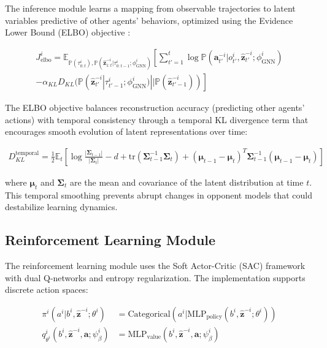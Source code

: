 The inference module learns a mapping from observable trajectories to latent variables predictive of other agents' behaviors, optimized using the Evidence Lower Bound (ELBO) objective \citep{kim2022influencing}:

\begin{align}
    J^i_{\text{elbo}} = \mathbb{E}_{\mathbb{P}(\tau^i_{0:t}),\mathbb{P}(\boldsymbol{\hat{z}}^{-i}_{1:t}|\tau^i_{0:t-1};\phi^i_{\text{GNN}})}\left[ \sum_{t'=1}^t \log \mathbb{P}(\boldsymbol{a}^{-i}_{t'}|o^i_{t'}, \boldsymbol{\hat{z}}^{-i}_{t'}; \phi^i_{\text{GNN}}) \right. \\
    \left. - \alpha_{KL} D_{KL}(\mathbb{P}(\boldsymbol{\hat{z}}^{-i}_{t'}|\tau^i_{t'-1}; \phi^i_{\text{GNN}})||\mathbb{P}(\boldsymbol{\hat{z}}^{-i}_{t'-1}))\right]
\end{align}

The ELBO objective balances reconstruction accuracy (predicting other agents' actions) with temporal consistency through a temporal KL divergence term that encourages smooth evolution of latent representations over time:

\begin{align}
    D_{KL}^{\text{temporal}} = \frac{1}{2} \mathbb{E}_t \left[ \log \frac{|\boldsymbol{\Sigma}_{t-1}|}{|\boldsymbol{\Sigma}_t|} - d + \text{tr}(\boldsymbol{\Sigma}_{t-1}^{-1}\boldsymbol{\Sigma}_t) + (\boldsymbol{\mu}_{t-1} - \boldsymbol{\mu}_t)^T \boldsymbol{\Sigma}_{t-1}^{-1} (\boldsymbol{\mu}_{t-1} - \boldsymbol{\mu}_t) \right]
\end{align}

where $\boldsymbol{\mu}_t$ and $\boldsymbol{\Sigma}_t$ are the mean and covariance of the latent distribution at time $t$. This temporal smoothing prevents abrupt changes in opponent models that could destabilize learning dynamics.

\subsection{Reinforcement Learning Module}

The reinforcement learning module uses the Soft Actor-Critic (SAC) framework with dual Q-networks and entropy regularization. The implementation supports discrete action spaces:

\begin{align}
    \pi^i(a^i|b^i, \boldsymbol{\hat{z}}^{-i}; \theta^i) &= \text{Categorical}(a^i|\text{MLP}_{\text{policy}}(b^i, \boldsymbol{\hat{z}}^{-i}; \theta^i)) \\
    q^i_{\theta^i}(b^i, \boldsymbol{\hat{z}}^{-i}, \boldsymbol{a}; \psi^i_{\beta}) &= \text{MLP}_{\text{value}}(b^i, \boldsymbol{\hat{z}}^{-i}, \boldsymbol{a}; \psi^i_{\beta})
\end{align}

